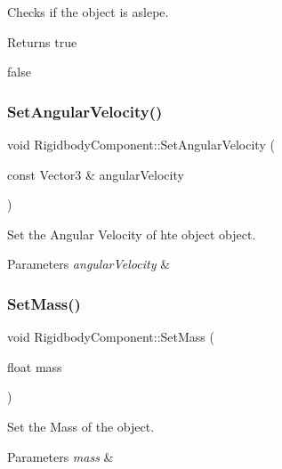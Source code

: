 Checks if the object is aslepe. 

\begin{DoxyReturn}{Returns}
true 

false 
\end{DoxyReturn}
\mbox{\label{classRigidbodyComponent_afba758ae0f34f537aa207ec405dd947e}} 
\subsubsection{\texorpdfstring{Set\+Angular\+Velocity()}{SetAngularVelocity()}}
{\footnotesize\ttfamily void Rigidbody\+Component\+::\+Set\+Angular\+Velocity (\begin{DoxyParamCaption}\item[{const Vector3 \&}]{angular\+Velocity }\end{DoxyParamCaption})}



Set the Angular Velocity of hte object object. 


\begin{DoxyParams}{Parameters}
{\em angular\+Velocity} & \\
\hline
\end{DoxyParams}
\mbox{\label{classRigidbodyComponent_a9e75d7dfef39fcccdd9ddf7416188d57}} 
\subsubsection{\texorpdfstring{Set\+Mass()}{SetMass()}}
{\footnotesize\ttfamily void Rigidbody\+Component\+::\+Set\+Mass (\begin{DoxyParamCaption}\item[{float}]{mass }\end{DoxyParamCaption})}



Set the Mass of the object. 


\begin{DoxyParams}{Parameters}
{\em mass} & \\
\hline
\end{DoxyParams}
\mbox{\label{classRigidbodyComponent_ab85528e62b5a1a81c5f6b9af821c6eb5}} 
